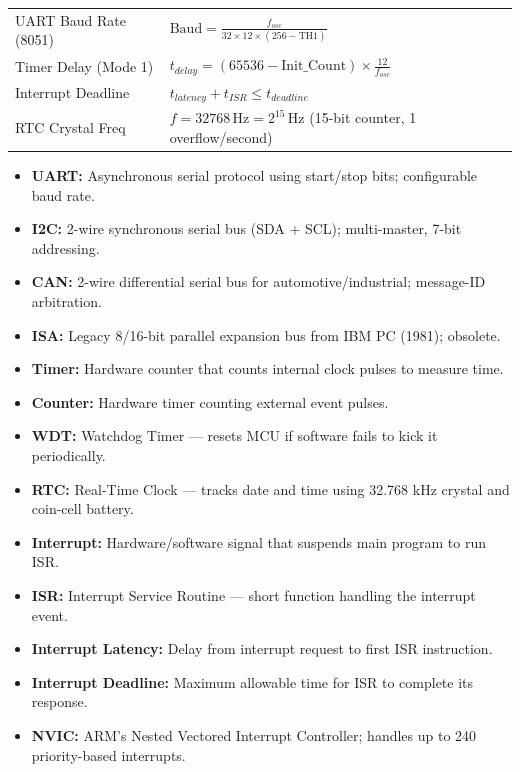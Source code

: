 \documentclass[12pt,a4paper]{article}
\renewcommand{\arraystretch}{1.45}
\begin{document}
\begin{tcolorbox}[formulabox, title={\textbf{Key Formulas at a Glance}}]
\renewcommand{\arraystretch}{1.3}
\begin{tabularx}{\linewidth}{B{4.5cm} X}
UART Baud Rate (8051) & $\text{Baud} = \displaystyle\frac{f_{osc}}{32 \times 12 \times (256 - \text{TH1})}$ \\[4pt]
Timer Delay (Mode 1) & $t_{delay} = (65536 - \text{Init\_Count}) \times \displaystyle\frac{12}{f_{osc}}$ \\[4pt]
Interrupt Deadline & $t_{latency} + t_{ISR} \leq t_{deadline}$ \\[4pt]
RTC Crystal Freq & $f = 32768\,\text{Hz} = 2^{15}\,\text{Hz}$ (15-bit counter, 1 overflow/second)
\end{tabularx}
\end{tcolorbox}

\begin{tcolorbox}[defbox, title={\textbf{One-Line Definitions}}]
\begin{itemize}[leftmargin=*, itemsep=2.5pt, topsep=0pt]
  \item \textbf{UART:} Asynchronous serial protocol using start/stop bits; configurable baud rate.
  \item \textbf{I2C:} 2-wire synchronous serial bus (SDA + SCL); multi-master, 7-bit addressing.
  \item \textbf{CAN:} 2-wire differential serial bus for automotive/industrial; message-ID arbitration.
  \item \textbf{ISA:} Legacy 8/16-bit parallel expansion bus from IBM PC (1981); obsolete.
  \item \textbf{Timer:} Hardware counter that counts internal clock pulses to measure time.
  \item \textbf{Counter:} Hardware timer counting external event pulses.
  \item \textbf{WDT:} Watchdog Timer --- resets MCU if software fails to kick it periodically.
  \item \textbf{RTC:} Real-Time Clock --- tracks date and time using 32.768 kHz crystal and coin-cell battery.
  \item \textbf{Interrupt:} Hardware/software signal that suspends main program to run ISR.
  \item \textbf{ISR:} Interrupt Service Routine --- short function handling the interrupt event.
  \item \textbf{Interrupt Latency:} Delay from interrupt request to first ISR instruction.
  \item \textbf{Interrupt Deadline:} Maximum allowable time for ISR to complete its response.
  \item \textbf{NVIC:} ARM's Nested Vectored Interrupt Controller; handles up to 240 priority-based interrupts.
\end{itemize}
\end{tcolorbox}
\end{document}
